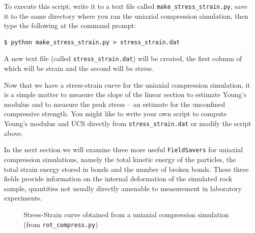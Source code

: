 \noindent
To execute this script, write it to a text file called \texttt{make\_stress\_strain.py}, save it to the same directory where you ran the uniaxial compression simulation, then type the following at the command prompt: 

\begin{verbatim}
$ python make_stress_strain.py > stress_strain.dat
\end{verbatim}

\noindent
A new text file (called \texttt{stress\_strain.dat}) will be created, the first column of which will be strain and the second will be stress. 

Now that we have a stress-strain curve for the uniaxial compression simulation, it is a simple matter to measure the slope of the linear section to estimate Young's modulus and to measure the peak stress -- an estimate for the unconfined compressive strength. You might like to write your own script to compute Young's modulus and UCS directly from \texttt{stress\_strain.dat} or modify the script above.

In the next section we will examine three more useful \texttt{FieldSavers} for uniaxial compression simulations, namely the total kinetic energy of the particles, the total strain energy stored in bonds and the number of broken bonds. These three fields provide information on the internal deformation of the simulated rock sample, quantities not usually directly amenable to measurement in laboratory experiments.

\begin{figure}
\begin{center}
\end{center}
\caption{Stress-Strain curve obtained from a uniaxial compression simulation (from \texttt{rot\_compress.py})} \label{fig:UCS_stress_strain}
\end{figure}


